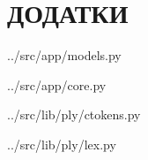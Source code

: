 \chapter*{ДОДАТКИ}
\label{7addition::doc}\label{7addition:id1}

{../src/app/models.py}

{../src/app/core.py}



{../src/lib/ply/ctokens.py}


{../src/lib/ply/lex.py}